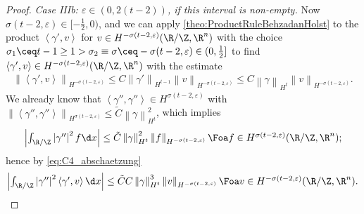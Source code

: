 \begin{proof}
    \textit{{Case IIIb:} $\varepsilon\in (0,2(t-2))$, if this interval is non-empty.}
    Now $ \sigma(t-2,\varepsilon)\in[-\frac{1}{2},0) $, and we can apply \cref{theo:ProductRuleBehzadanHolst} to the product $ \left\langle \gamma',v \right\rangle  $ for $ v\in H^{-\sigma(t-2,\varepsilon)}(\R/\Z,\R^n) $ with the choice $ \sigma_1\ceq t-1\ge 1>\sigma_2\equiv\sigma\ceq-\sigma(t-2,\varepsilon) \in (0,\frac{1}{2}]$ to find $ \left\langle \gamma',v \right\rangle \in H^{-\sigma(t-2,\varepsilon)}(\R/\Z,\R^n) $ with the estimate 
   \begin{equation}\label{eq:C4_abschaetzung}
   \begin{aligned}
    \left\|\left\langle \gamma',v \right\rangle  \right\|_{H^{-\sigma(t-2,\varepsilon)}}\le C\left\|\gamma' \right\|_{H^{t-1}}\left\|v \right\|_{H^{-\sigma(t-2,\varepsilon)}}
        \le C\left\|\gamma \right\|_{H^{t}}\left\|v \right\|_{H^{-\sigma(t-2,\varepsilon)}}.
   \end{aligned}
   \end{equation}
    We already know that $ \left\langle \gamma'',\gamma'' \right\rangle \in H^{\sigma(t-2,\varepsilon)} $ with $ \left\|\left\langle \gamma'',\gamma'' \right\rangle  \right\|_{H^{\sigma(t-2,\varepsilon)}}\le \tilde{C}\left\|\gamma \right\|_{H^t}^2 $, which implies 
    \begin{align*}\textstyle
        \left|\int_{\R/\Z}\left|\gamma'' \right|^2f\d x \right|\le \tilde{C}\left\|\gamma \right\|^2_{H^t}\left\|f \right\|_{H^{-\sigma(t-2,\varepsilon)}}\Foa f\in H^{\sigma(t-2,\varepsilon)}(\R/\Z,\R^n);
    \end{align*}
    hence by \cref{eq:C4_abschaetzung} 
    \begin{align*}\textstyle
        \left|\int_{\R/\Z}\left|\gamma'' \right|^2 \left\langle \gamma',v \right\rangle \d x \right|\le \tilde{C}C\left\|\gamma\right\|^3_{H^{t}}\left\|v \right\|_{H^{-\sigma(t-2,\varepsilon)}} \Foa v\in H^{-\sigma(t-2,\varepsilon)}(\R/\Z,\R^n). 
    \end{align*}
\end{proof}

